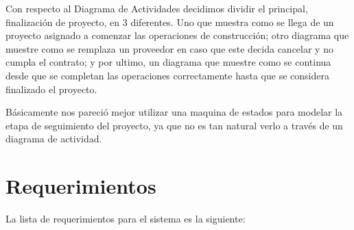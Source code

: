 \documentclass{article}
\theoremstyle{definition}
\theoremstyle{remark}
\begin{document}
Con respecto al Diagrama de Actividades decidimos dividir el principal, finalización de proyecto, en 3 diferentes. Uno que muestra como se llega de un proyecto asignado a comenzar las operaciones de construcción; otro diagrama que muestre como se remplaza un proveedor en caso que este decida cancelar y no cumpla el contrato; y por ultimo, un diagrama que muestre como se continua desde que se completan las operaciones correctamente hasta que se considera finalizado el proyecto.

Básicamente nos pareció mejor utilizar una maquina de estados para modelar la etapa de seguimiento del proyecto, ya que no es tan natural verlo a través de un diagrama de actividad. 

\section{Requerimientos}

La lista de requerimientos para el sistema es la siguiente:
\end{document}
